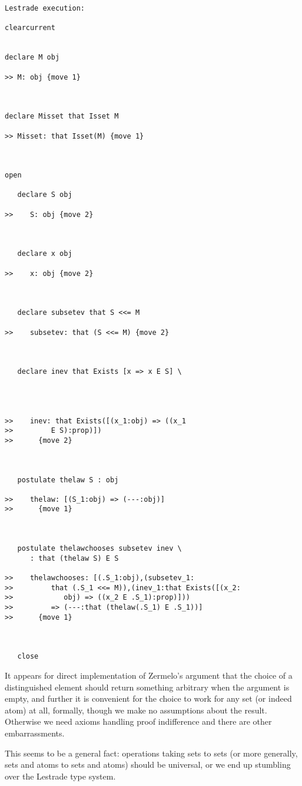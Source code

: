 \documentclass[12pt]{article}
\begin{document}
\begin{verbatim}Lestrade execution:

clearcurrent


declare M obj

>> M: obj {move 1}



declare Misset that Isset M

>> Misset: that Isset(M) {move 1}



open

   declare S obj

>>    S: obj {move 2}



   declare x obj

>>    x: obj {move 2}



   declare subsetev that S <<= M

>>    subsetev: that (S <<= M) {move 2}



   declare inev that Exists [x => x E S] \
      



>>    inev: that Exists([(x_1:obj) => ((x_1
>>         E S):prop)])
>>      {move 2}



   postulate thelaw S : obj

>>    thelaw: [(S_1:obj) => (---:obj)]
>>      {move 1}



   postulate thelawchooses subsetev inev \
      : that (thelaw S) E S

>>    thelawchooses: [(.S_1:obj),(subsetev_1:
>>         that (.S_1 <<= M)),(inev_1:that Exists([(x_2:
>>            obj) => ((x_2 E .S_1):prop)]))
>>         => (---:that (thelaw(.S_1) E .S_1))]
>>      {move 1}



   close
\end{verbatim}

It appears for direct implementation of Zermelo's argument that the choice of a distinguished element should return something arbitrary when the argument is empty,
and further it is convenient for the choice to work for any set (or indeed atom) at all, formally, though we make no assumptions about the result.  Otherwise we need
axioms handling proof indifference and there are other embarrassments.

This seems to be a general fact:  operations taking sets to sets (or more generally, sets and atoms to sets and atoms) should be universal, or we end up stumbling over the Lestrade type system.
\end{document}
